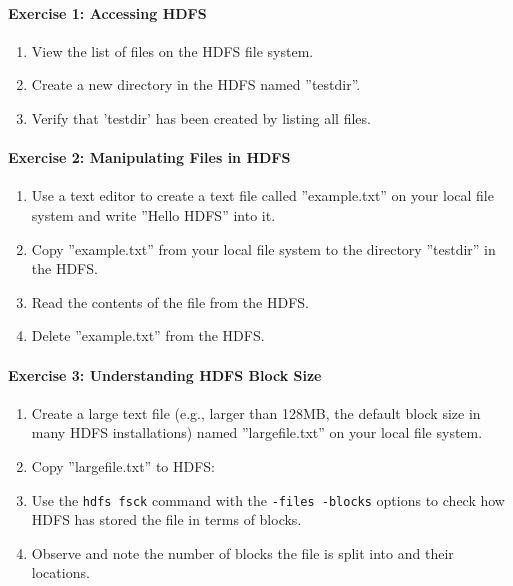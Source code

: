 \begin{exercisebox}
\paragraph*{Exercise 1: Accessing HDFS}

\begin{enumerate}
  \item View the list of files on the HDFS file system.
  \item Create a new directory in the HDFS named ''testdir''.
  \item Verify that 'testdir' has been created by listing all files.
\end{enumerate}

\paragraph*{Exercise 2: Manipulating Files in HDFS}

\begin{enumerate}
  \item Use a text editor to create a text file called ''example.txt'' on your local file system and write ''Hello HDFS'' into it.
  \item Copy ''example.txt'' from your local file system to the directory ''testdir'' in the HDFS.
  \item Read the contents of the file from the HDFS.
  \item Delete ''example.txt'' from the HDFS.
\end{enumerate}

\paragraph*{Exercise 3: Understanding HDFS Block Size}

\begin{enumerate}
  \item Create a large text file (e.g., larger than 128MB, the default block size in many HDFS installations) named ''largefile.txt'' on your local file system.
  \item Copy ''largefile.txt'' to HDFS:
  \item Use the \texttt{hdfs fsck} command with the \texttt{-files -blocks} options to check how HDFS has stored the file in terms of blocks.
  \item Observe and note the number of blocks the file is split into and their locations.
\end{enumerate}

\end{exercisebox}

